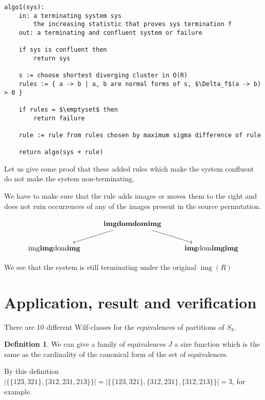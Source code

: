 \documentclass[openany, a4paper, 11pt, english]{article}
\theoremstyle{definition}
\newtheorem{definition}[theorem]{Definition}
\DeclareMathOperator{\img}{img}
\begin{document}
\lstset{basicstyle=\footnotesize\ttfamily, frame=single, breaklines=true,
mathescape=true}
\begin{minipage}{\linewidth}
\begin{lstlisting}[title={Algorithm 1}]
algo1(sys):
    in: a terminating system sys
        the increasing statistic that proves sys termination f
    out: a terminating and confluent system or failure

    if sys is confluent then
        return sys

    s := choose shortest diverging cluster in O(R)
    rules := { a -> b | a, b are normal forms of s, $\Delta_f$(a -> b) > 0 }

    if rules = $\emptyset$ then
        return failure

    rule := rule from rules chosen by maximum sigma difference of rule

    return algo(sys + rule)
\end{lstlisting}
\end{minipage}

Let us give some proof that these added rules which make the system confluent do
not make the system non-terminating.
 
We have to make sure that the rule adds images or moves them to the right and does not ruin
occurrences of any of the images present in the source permutation.

\[
\begin{tikzcd}  
    & \mathbf{imgdomdomimg} \arrow[dl] \arrow[dr] & \\
    \mathrm{img}\mathbf{img}\mathrm{dom}\mathbf{img} & &
    \mathbf{img}\mathrm{dom}\mathbf{imgimg}
\end{tikzcd}
\]

We see that the system is still terminating under the original $\img(R)$

\section{Application, result and verification}
There are 10 different Wilf-classes for the equivalences of partitions of $S_3$.

\begin{definition}
    We can give a family of equivalences $J$ a size function which is the same
    as the cardinality of the canonical form of the set of equivalences.

    By this definition $| \{ \{ 123, 321 \}, \{ 312, 231, 213 \} \}| = | \{ \{
    123, 321 \}, \{ 312, 231 \}, \{ 312, 213 \} \} | = 3$, for example.
\end{definition}
\end{document}
